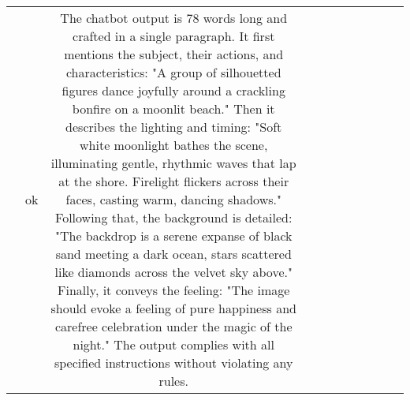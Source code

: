 \begin{table}[h!]
\begin{tabular}{|c|c|c|c|c|c|c|c|c|c|c|}
 & ok & The chatbot output is 78 words long and crafted in a single paragraph. It first mentions the subject, their actions, and characteristics: "A group of silhouetted figures dance joyfully around a crackling bonfire on a moonlit beach." Then it describes the lighting and timing: "Soft white moonlight bathes the scene, illuminating gentle, rhythmic waves that lap at the shore. Firelight flickers across their faces, casting warm, dancing shadows." Following that, the background is detailed: "The backdrop is a serene expanse of black sand meeting a dark ocean, stars scattered like diamonds across the velvet sky above." Finally, it conveys the feeling: "The image should evoke a feeling of pure happiness and carefree celebration under the magic of the night." The output complies with all specified instructions without violating any rules.


\end{tabular}
\end{table}
